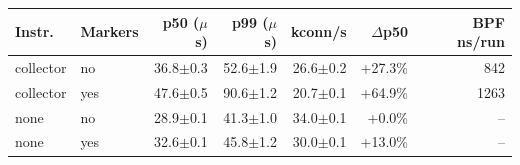 \begin{tabular*}{\columnwidth}{@{\extracolsep{\fill}}llrrrrr@{}}
\toprule
Instr. & Markers & p50 ($\mu$s) & p99 ($\mu$s) & kconn/s & $\Delta$p50 & BPF ns/run \\
\midrule
collector & no & 36.8$\pm$0.3 & 52.6$\pm$1.9 & 26.6$\pm$0.2 & +27.3\% & 842 \\
collector & yes & 47.6$\pm$0.5 & 90.6$\pm$1.2 & 20.7$\pm$0.1 & +64.9\% & 1263 \\
none & no & 28.9$\pm$0.1 & 41.3$\pm$1.0 & 34.0$\pm$0.1 & +0.0\% & -- \\
none & yes & 32.6$\pm$0.1 & 45.8$\pm$1.2 & 30.0$\pm$0.1 & +13.0\% & -- \\
\bottomrule
\end{tabular*}
